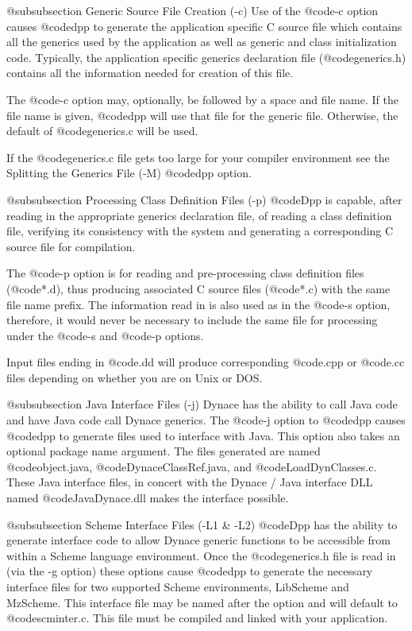 @subsubsection Generic Source File Creation (-c)
Use of the @code{-c} option causes @code{dpp} to generate the
application specific C source file which contains all the
generics used by the application as well as generic and class
initialization code.  Typically, the application specific
generics declaration file (@code{generics.h}) contains
all the information needed for creation of this file.

The @code{-c} option may, optionally, be followed by a space and file
name.  If the file name is given, @code{dpp} will use that file for the
generic file.  Otherwise, the default of @code{generics.c} will be used.

If the @code{generics.c} file gets too large for your compiler environment
see the Splitting the Generics File (-M) @code{dpp} option.

@subsubsection Processing Class Definition Files (-p)
@code{Dpp} is capable, after reading in the appropriate generics
declaration file, of reading a class definition file, verifying
its consistency with the system and generating a corresponding
C source file for compilation.

The @code{-p} option is for reading and pre-processing class
definition files (@code{*.d}), thus producing associated
C source files (@code{*.c}) with the same file name prefix.
The information read in is also used as in the @code{-s} option,
therefore, it would never be necessary to include the same
file for processing under the @code{-s} and @code{-p} options.

Input files ending in @code{.dd} will produce corresponding
@code{.cpp} or @code{.cc} files depending on whether you are
on Unix or DOS.

@subsubsection Java Interface Files (-j)
Dynace has the ability to call Java code and have Java code
call Dynace generics.  The @code{-j} option to @code{dpp}
causes @code{dpp} to generate files used to interface with Java.
This option also takes an optional package name argument.
The files generated are named @code{object.java},
@code{DynaceClassRef.java}, and @code{LoadDynClasses.c}.
These Java interface files, in concert with the Dynace / Java interface DLL
named @code{JavaDynace.dll} makes the interface possible.

@subsubsection Scheme Interface Files (-L1 & -L2)
@code{Dpp} has the ability to generate interface code to allow Dynace
generic functions to be accessible from within a Scheme language
environment.  Once the @code{generics.h} file is read in (via the -g
option) these options cause @code{dpp} to generate the necessary
interface files for two supported Scheme environments, LibScheme and
MzScheme.  This interface file may be named after the option and
will default to @code{scminter.c}.  This file must be compiled and
linked with your application.

